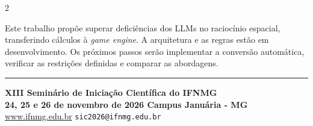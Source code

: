 \begin{paracol}{2}
\divsec


{\fBody
Este trabalho propõe superar deficiências dos LLMs no raciocínio espacial, transferindo cálculos à \textit{game engine}. A arquitetura e as regras estão em desenvolvimento. Os próximos passos serão implementar a conversão automática, verificar as restrições definidas e comparar as abordagens.
}\par

\divsec


{\renewcommand*{\bibfont}{\fRef}%
\setlength{\bibitemsep}{4pt}%
\printbibliography[heading=none]}

\end{paracol}

\vspace{5mm}
{\color{sicverde}\rule{\linewidth}{2pt}}
\vspace{3mm}

\begin{center}
  {\fSmall\bfseries\color{sicverdescuro}
    XIII Semin\'{a}rio de Inicia\c{c}\~{a}o Cient\'{i}fica do IFNMG\\[3pt]
    24, 25 e 26 de novembro de 2026\enspace\textperiodcentered\enspace
    Campus Januária - MG
  }\\[4pt]
  {\fRef\color{siccinza}
    \faGlobe\enspace\url{www.ifnmg.edu.br}
    \quad\textbar\quad
    \faEnvelope\enspace\texttt{sic2026@ifnmg.edu.br}
  }
\end{center}


